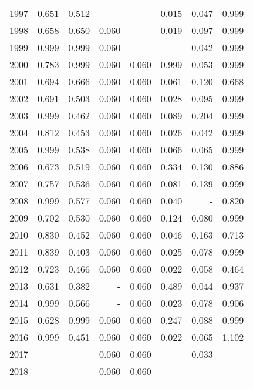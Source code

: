 \begin{longtable}{lrrrrrrr}
  1997 & 0.651 & 0.512 & - & - & 0.015 & 0.047 & 0.999 \\ 
  1998 & 0.658 & 0.650 & 0.060 & - & 0.019 & 0.097 & 0.999 \\ 
  1999 & 0.999 & 0.999 & 0.060 & - & - & 0.042 & 0.999 \\ 
  2000 & 0.783 & 0.999 & 0.060 & 0.060 & 0.999 & 0.053 & 0.999 \\ 
  2001 & 0.694 & 0.666 & 0.060 & 0.060 & 0.061 & 0.120 & 0.668 \\ 
  2002 & 0.691 & 0.503 & 0.060 & 0.060 & 0.028 & 0.095 & 0.999 \\ 
  2003 & 0.999 & 0.462 & 0.060 & 0.060 & 0.089 & 0.204 & 0.999 \\ 
  2004 & 0.812 & 0.453 & 0.060 & 0.060 & 0.026 & 0.042 & 0.999 \\ 
  2005 & 0.999 & 0.538 & 0.060 & 0.060 & 0.066 & 0.065 & 0.999 \\ 
  2006 & 0.673 & 0.519 & 0.060 & 0.060 & 0.334 & 0.130 & 0.886 \\ 
  2007 & 0.757 & 0.536 & 0.060 & 0.060 & 0.081 & 0.139 & 0.999 \\ 
  2008 & 0.999 & 0.577 & 0.060 & 0.060 & 0.040 & - & 0.820 \\ 
  2009 & 0.702 & 0.530 & 0.060 & 0.060 & 0.124 & 0.080 & 0.999 \\ 
  2010 & 0.830 & 0.452 & 0.060 & 0.060 & 0.046 & 0.163 & 0.713 \\ 
  2011 & 0.839 & 0.403 & 0.060 & 0.060 & 0.025 & 0.078 & 0.999 \\ 
  2012 & 0.723 & 0.466 & 0.060 & 0.060 & 0.022 & 0.058 & 0.464 \\ 
  2013 & 0.631 & 0.382 & - & 0.060 & 0.489 & 0.044 & 0.937 \\ 
  2014 & 0.999 & 0.566 & - & 0.060 & 0.023 & 0.078 & 0.906 \\ 
  2015 & 0.628 & 0.999 & 0.060 & 0.060 & 0.247 & 0.088 & 0.999 \\ 
  2016 & 0.999 & 0.451 & 0.060 & 0.060 & 0.022 & 0.065 & 1.102 \\ 
  2017 & - & - & 0.060 & 0.060 & - & 0.033 & - \\ 
  2018 & - & - & 0.060 & 0.060 & - & - & - \\ 
   \hline
\hline
\label{tab:epsilon2}
\end{longtable}
\endgroup
